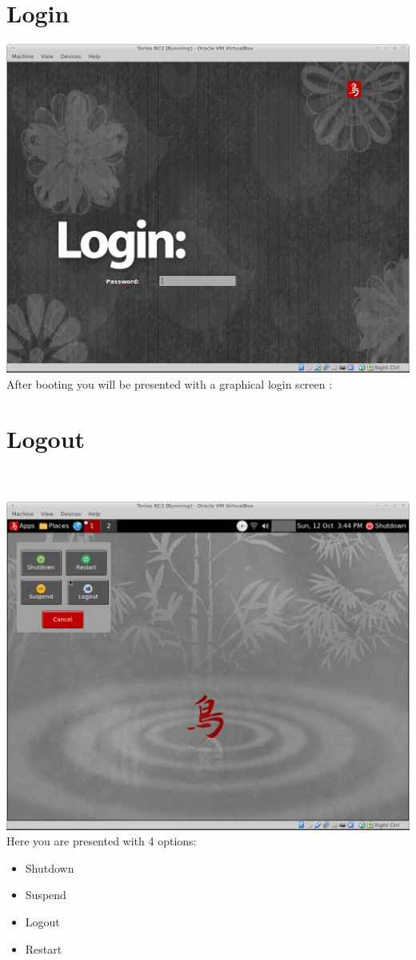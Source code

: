 \documentclass[12pt,a4paper]{book}
\begin{document}
 
\newpage

\chapter{Login}

\includegraphics[width=0.8\linewidth]{screen-shots/torios-rc2-login-screen} \\

After booting you will be presented with a graphical login screen :

\chapter{Logout}

\\
\\
\includegraphics[width=0.8\linewidth]{screen-shots/torios-rc2-shutdown-menu} 
Here you are presented with 4 options:\\
\begin{itemize}
\item{Shutdown}
\item{Suspend}
\item{Logout}
\item{Restart}

\end{itemize}
\end{document}

